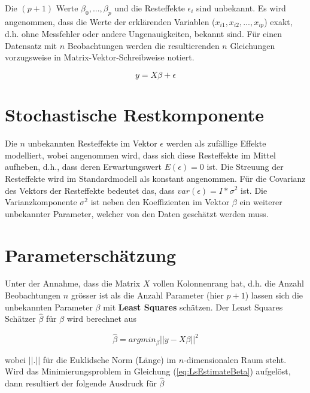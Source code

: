\documentclass[]{book}
\begin{document}
Die \((p+1)\) Werte \(\beta_0, ..., \beta_p\) und die Resteffekte
\(\epsilon_i\) sind unbekannt. Es wird angenommen, dass die Werte der
erklärenden Variablen (\(x_{i1}, x_{i2}, ..., x_{ip}\)) exakt, d.h. ohne
Messfehler oder andere Ungenauigkeiten, bekannt sind. Für einen
Datensatz mit \(n\) Beobachtungen werden die resultierenden \(n\)
Gleichungen vorzugsweise in Matrix-Vektor-Schreibweise notiert.

\begin{equation}
y = X\beta + \epsilon
\label{eq:StandardLinearModelMatrixVektor}
\end{equation}

\section{Stochastische
Restkomponente}\label{stochastische-restkomponente}

Die \(n\) unbekannten Resteffekte im Vektor \(\epsilon\) werden als
zufällige Effekte modelliert, wobei angenommen wird, dass sich diese
Resteffekte im Mittel aufheben, d.h., dass deren Erwartungswert
\(E(\epsilon) = 0\) ist. Die Streuung der Resteffekte wird im
Standardmodell als konstant angenommen. Für die Covarianz des Vektors
der Resteffekte bedeutet das, dass \(var(\epsilon) = I*\sigma^2\) ist.
Die Varianzkomponente \(\sigma^2\) ist neben den Koeffizienten im Vektor
\(\beta\) ein weiterer unbekannter Parameter, welcher von den Daten
geschätzt werden muss.

\section{Parameterschätzung}\label{parameterschatzung}

Unter der Annahme, dass die Matrix \(X\) vollen Kolonnenrang hat, d.h.
die Anzahl Beobachtungen \(n\) grösser ist als die Anzahl Parameter
(hier \(p+1\)) lassen sich die unbekannten Parameter \(\beta\) mit
\textbf{Least Squares} schätzen. Der Least Squares Schätzer
\(\hat{\beta}\) für \(\beta\) wird berechnet aus

\begin{equation}
\hat{\beta} = argmin_{\beta}||y - X\beta||^2
\label{eq:LsEstimateBeta}
\end{equation}

wobei \(||.||\) für die Euklidsche Norm (Länge) im \(n\)-dimensionalen
Raum steht. Wird das Minimierungsproblem in Gleichung
(\ref{eq:LsEstimateBeta}) aufgelöst, dann resultiert der folgende
Ausdruck für \(\hat{\beta}\)
\end{document}
